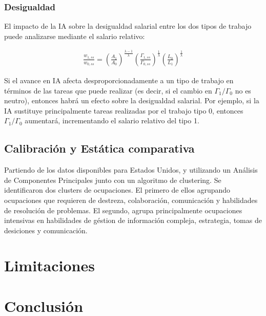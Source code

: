 \documentclass{article}
\theoremstyle{remark}
\theoremstyle{definition}
\begin{document}
\subsubsection{Desigualdad}

El impacto de la IA sobre la desigualdad salarial entre los dos tipos de trabajo puede analizarse mediante el salario relativo:

\begin{align*}
    \frac{w_{1,ss}}{w_{0,ss}} = \left( \frac{A_1}{A_0} \right)^{\frac{\lambda-1}{\lambda}} \left( \frac{\Gamma_{1,ss}}{\Gamma_{0,ss}} \right)^{\frac{1}{\lambda}} \left( \frac{L_0}{L_1} \right)^{\frac{1}{\lambda}}
\end{align*}

Si el avance en IA afecta desproporcionadamente a un tipo de trabajo en términos de las tareas que puede realizar (es decir, si el cambio en $\Gamma_1/\Gamma_0$ no es neutro), entonces habrá un efecto sobre la desigualdad salarial. Por ejemplo, si la IA sustituye principalmente tareas realizadas por el trabajo tipo 0, entonces $\Gamma_1/\Gamma_0$ aumentará, incrementando el salario relativo del tipo 1.

\subsection{Calibraci\'on y Est\'atica comparativa}
Partiendo de los datos disponibles para Estados Unidos, y utilizando un An\'alisis de Componentes Principales junto con un algoritmo de clustering. Se identificaron dos clusters de ocupaciones. El primero de ellos agrupando ocupaciones que requieren de destreza, colaboraci\'on, comunicaci\'on y habilidades de resoluci\'on de problemas. El segundo, agrupa principalmente ocupaciones intensivas en habilidades de g\'estion de informaci\'on compleja, estrategia, tomas de desiciones y comunicaci\'on.

\section{Limitaciones}

\section{Conclusi\'on}
\end{document}
